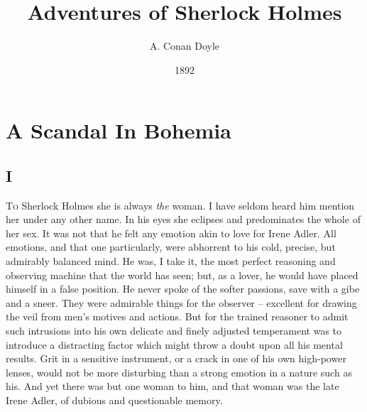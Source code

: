 
\frenchspacing

\newenvironment{letter}%
{\begin{list}{}{%
\setlength{\leftmargin}{1em}
\setlength{\rightmargin}{\leftmargin}
\setlength{\parsep}{0em}
\setlength{\listparindent}{\parindent}
}\item[]}
{\end{list}}

\newcommand{\chsec}[1]{
\vspace{0em plus 5\baselineskip}
\section*{\centering #1}}

\newcommand{\Chapter}[1]{
\chapter{#1}
\vspace{0em plus 2\baselineskip}}

\renewcommand{\thechapter}{\Roman{chapter}}

\frontmatter
\title{Adventures of Sherlock Holmes}
\author{A. Conan Doyle}
\date{1892}

\maketitle
\tableofcontents

\mainmatter
\Chapter{A Scandal In Bohemia}

\chsec{I}

\textsc{To} Sherlock Holmes she is always \textit{the} woman. I
have seldom heard him mention her under any
other name. In his eyes she eclipses and predominates
the whole of her sex. It was not that he
felt any emotion akin to love for Irene Adler. All emotions,
and that one particularly, were abhorrent to his cold, precise,
but admirably balanced mind. He was, I take it, the most
perfect reasoning and observing machine that the world has
seen; but, as a lover, he would have placed himself in a false
position. He never spoke of the softer passions, save with
a gibe and a sneer. They were admirable things for the
observer -- excellent for drawing the veil from men’s motives
and actions. But for the trained reasoner to admit such intrusions
into his own delicate and finely adjusted temperament
was to introduce a distracting factor which might throw
a doubt upon all his mental results. Grit in a sensitive instrument,
or a crack in one of his own high-power lenses, would
not be more disturbing than a strong emotion in a nature
such as his. And yet there was but one woman to him, and
that woman was the late Irene Adler, of dubious and questionable
memory.

